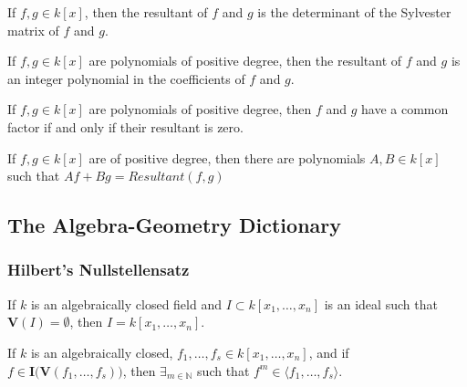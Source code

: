 \documentclass[crop=false,class=book]{standalone}
\begin{document}
\begin{theorem}
If $f,g \in k[x]$, then the resultant of $f$ and $g$ is the determinant of the Sylvester matrix of $f$ and $g$.
\end{theorem}
\begin{theorem}
If $f,g\in k[x]$ are polynomials of positive degree, then the resultant of $f$ and $g$ is an integer polynomial in the coefficients of $f$ and $g$.
\end{theorem}
\begin{theorem}
If $f,g\in k[x]$ are polynomials of positive degree, then $f$ and $g$ have a common factor if and only if their resultant is zero.
\end{theorem}
\begin{theorem}
If $f,g\in k[x]$ are of positive degree, then there are polynomials $A,B \in k[x]$ such that $Af + Bg = Resultant(f,g)$
\end{theorem}
\subsection{The Algebra-Geometry Dictionary}
\subsubsection{Hilbert's Nullstellensatz}
\begin{theorem}
If $k$ is an algebraically closed field and $I \subset k[x_1,\hdots ,x_n]$ is an ideal such that $\mathbf{V}(I) = \emptyset$, then $I = k[x_1,\hdots ,x_n]$.
\end{theorem}
\begin{theorem}
If $k$ is an algebraically closed, $f_{1},\hdots,f_{s}\in k[x_{1},\hdots,x_{n}]$, and if $f\in \textbf{I}\big(\mathbf{V}(f_1,\hdots, f_s)\big)$, then $\exists_{m\in\mathbb{N}}$ such that $f^m \in \langle f_1,\hdots, f_s \rangle$.
\end{theorem}
\end{document}
